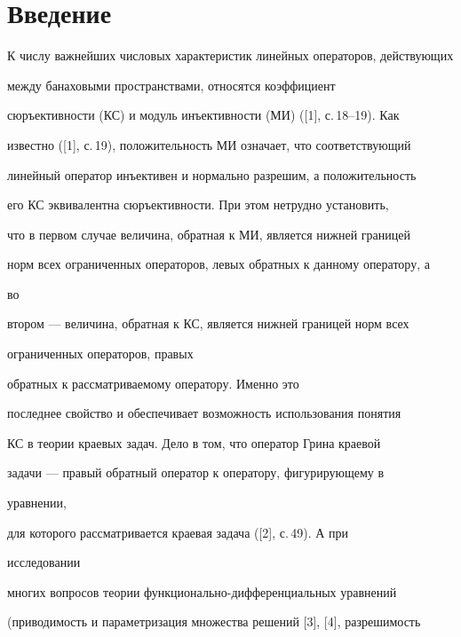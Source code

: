 \maketitle 


\label{begin} 


 


\section*{Введение} 


 


К числу важнейших числовых характеристик линейных операторов, действующих 


между банаховыми пространствами, относятся коэффициент  


сюръективности (КС) и модуль инъективности (МИ) ([1], с.\,18--19). Как  


известно ([1], с.\,19), положительность МИ означает, что соответствующий 


линейный оператор инъективен и нормально разрешим, а положительность 


его КС эквивалентна сюръективности. При этом нетрудно установить, 


что в первом случае величина, обратная к МИ, является нижней границей 


норм всех ограниченных операторов, левых обратных к данному оператору, а 


во  


втором --- величина, обратная к КС, является нижней границей норм всех 


ограниченных операторов, правых  


обратных к рассматриваемому оператору. Именно это  


последнее свойство и обеспечивает возможность использования понятия  


КС в теории краевых задач. Дело в том, что оператор Грина краевой 


задачи --- правый обратный оператор к оператору, фигурирующему в 


уравнении, 


для которого рассматривается краевая задача ([2], с.\,49). А при 


исследовании  


многих вопросов теории функционально-дифференциальных уравнений  


(приводимость и параметризация множества решений [3], [4], разрешимость  


